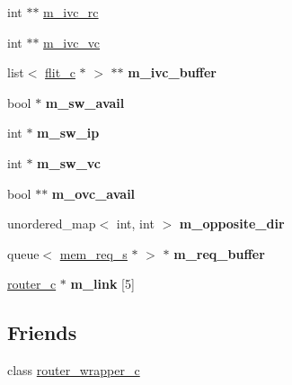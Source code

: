 \begin{DoxyCompactItemize}
\item 
int $\ast$$\ast$ \hyperlink{classrouter__c_ac954004722bae143a3c864483fc215b1}{m\_\-ivc\_\-rc}
\item 
int $\ast$$\ast$ \hyperlink{classrouter__c_a0616862e6a4f2c02b494f34ccace2347}{m\_\-ivc\_\-vc}
\item 
\hypertarget{classrouter__c_aa9d526b5e4f5b5686b30b5e07a4be163}{
list$<$ \hyperlink{classflit__c}{flit\_\-c} $\ast$ $>$ $\ast$$\ast$ {\bfseries m\_\-ivc\_\-buffer}}
\label{classrouter__c_aa9d526b5e4f5b5686b30b5e07a4be163}

\item 
\hypertarget{classrouter__c_a6f8a1e9bebf10d35e6da1996f4c57f8d}{
bool $\ast$ {\bfseries m\_\-sw\_\-avail}}
\label{classrouter__c_a6f8a1e9bebf10d35e6da1996f4c57f8d}

\item 
\hypertarget{classrouter__c_a5d6b0d1215dba03998993dff7e7b3e75}{
int $\ast$ {\bfseries m\_\-sw\_\-ip}}
\label{classrouter__c_a5d6b0d1215dba03998993dff7e7b3e75}

\item 
\hypertarget{classrouter__c_a38995a07df7652752b63d5b61e98748d}{
int $\ast$ {\bfseries m\_\-sw\_\-vc}}
\label{classrouter__c_a38995a07df7652752b63d5b61e98748d}

\item 
\hypertarget{classrouter__c_a4dfe73d6383f8a5cc5ef886368277cdb}{
bool $\ast$$\ast$ {\bfseries m\_\-ovc\_\-avail}}
\label{classrouter__c_a4dfe73d6383f8a5cc5ef886368277cdb}

\item 
\hypertarget{classrouter__c_a6a0be6f9f9b35dbbb5a14eafeaaa8b69}{
unordered\_\-map$<$ int, int $>$ {\bfseries m\_\-opposite\_\-dir}}
\label{classrouter__c_a6a0be6f9f9b35dbbb5a14eafeaaa8b69}

\item 
\hypertarget{classrouter__c_a8d329c154ea19037812ee35da61149c2}{
queue$<$ \hyperlink{structmem__req__s}{mem\_\-req\_\-s} $\ast$ $>$ $\ast$ {\bfseries m\_\-req\_\-buffer}}
\label{classrouter__c_a8d329c154ea19037812ee35da61149c2}

\item 
\hypertarget{classrouter__c_a0c717f58b87f4295ea88d65816286e66}{
\hyperlink{classrouter__c}{router\_\-c} $\ast$ {\bfseries m\_\-link} \mbox{[}5\mbox{]}}
\label{classrouter__c_a0c717f58b87f4295ea88d65816286e66}

\end{DoxyCompactItemize}
\subsection*{Friends}
\begin{DoxyCompactItemize}
\item 
\hypertarget{classrouter__c_a153a99aed0b9e21171af127262727996}{
class \hyperlink{classrouter__c_a153a99aed0b9e21171af127262727996}{router\_\-wrapper\_\-c}}
\label{classrouter__c_a153a99aed0b9e21171af127262727996}

\end{DoxyCompactItemize}


